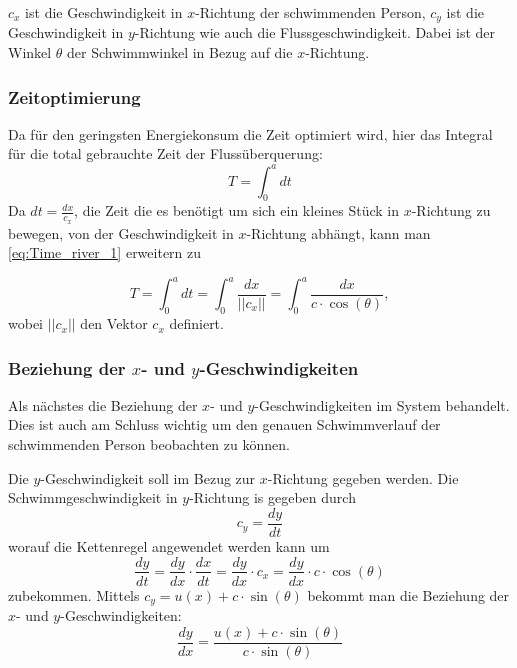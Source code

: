 \(c_x\) ist die Geschwindigkeit in \(x\)-Richtung der schwimmenden Person, \(c_y\) ist die Geschwindigkeit in \(y\)-Richtung wie auch die Flussgeschwindigkeit. Dabei ist der Winkel \(\theta\) der Schwimmwinkel in Bezug auf die \(x\)-Richtung.


\subsubsection{Zeitoptimierung}

Da für den geringsten Energiekonsum die Zeit optimiert wird, hier das Integral für die total gebrauchte Zeit der Flussüberquerung:
\begin{equation}
    T = \int_0^adt \label{eq:Time_river_1}
\end{equation}
Da \(dt = \frac{dx}{c_x}\), die Zeit die es benötigt um sich ein kleines Stück in \(x\)-Richtung zu bewegen, von der Geschwindigkeit in \(x\)-Richtung abhängt, kann man \eqref{eq:Time_river_1} erweitern zu

\begin{equation}
    T = \int_0^adt = \int_0^a\frac{dx}{||c_x||} = \int_0^a\frac{dx}{c\cdot \cos(\theta)} \label{eq:Time_river_2},
\end{equation}
wobei \(||c_x||\) den Vektor \(c_x\) definiert. 


\subsubsection{Beziehung der \(x\)- und \(y\)-Geschwindigkeiten}

Als nächstes die Beziehung der \(x\)- und \(y\)-Geschwindigkeiten im System behandelt. Dies ist auch am Schluss wichtig um den genauen Schwimmverlauf der schwimmenden Person beobachten zu können.

Die \(y\)-Geschwindigkeit soll im Bezug zur \(x\)-Richtung gegeben werden. Die Schwimmgeschwindigkeit in \(y\)-Richtung is gegeben durch
\begin{equation}
    c_y = \frac{dy}{dt}
\end{equation}
worauf die Kettenregel angewendet werden kann um
\begin{equation}
    \frac{dy}{dt} = \frac{dy}{dx} \cdot \frac{dx}{dt} = \frac{dy}{dx}\cdot c_x = \frac{dy}{dx}\cdot c\cdot \cos(\theta)
\end{equation}
zubekommen. Mittels \(c_y = u(x) + c\cdot \sin(\theta)\) bekommt man die Beziehung der \(x\)- und \(y\)-Geschwindigkeiten:
\begin{equation}
    \frac{dy}{dx} = \frac{u(x) + c \cdot \sin(\theta)}{c \cdot \sin(\theta)} \label{eq:dy_dx}
\end{equation}



